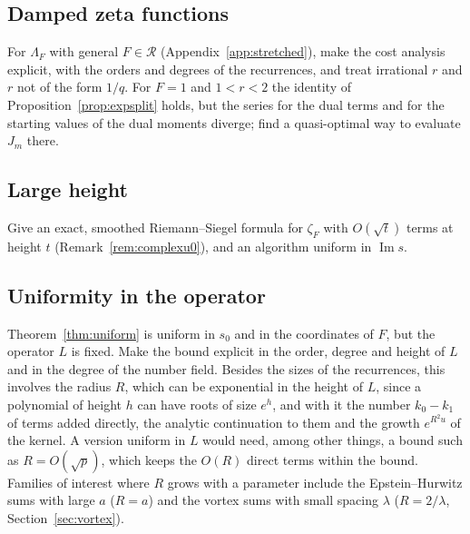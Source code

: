 \documentclass[11pt,reqno]{amsart}
\theoremstyle{definition}
\theoremstyle{remark}
\newcommand{\Reg}{\mathcal{R}}
\begin{document}
\subsection{Damped zeta functions}
For $\Lambda_F$ with general $F \in \Reg$ (Appendix~\ref{app:stretched}), make the cost analysis explicit, with the orders
and degrees of the recurrences, and treat irrational $r$ and $r$ not of the form $1/q$. For $F = 1$ and $1 < r < 2$
the identity of Proposition~\ref{prop:expsplit} holds, but the series for the dual terms and for the starting values
of the dual moments diverge; find a quasi-optimal way to evaluate $J_m$ there.

\subsection{Large height}
Give an exact, smoothed Riemann--Siegel formula for $\zeta_F$ with $O(\sqrt t)$ terms at height $t$
(Remark~\ref{rem:complexu0}), and an algorithm uniform in $\operatorname{Im}s$.

\subsection{Uniformity in the operator}\label{sec:openuniform}
Theorem~\ref{thm:uniform} is uniform in $s_0$ and in the coordinates of $F$, but the operator $L$ is fixed. Make the
bound explicit in the order, degree and height of $L$ and in the degree of the number field. Besides the sizes of the
recurrences, this involves the radius $R$, which can be exponential in the height of $L$, since a polynomial of height
$h$ can have roots of size $e^h$, and with it the number $k_0 - k_1$ of terms added directly, the analytic
continuation to them and the growth $e^{R^2u}$ of the kernel. A version uniform in $L$ would need, among other
things, a bound such as $R = O(\sqrt p)$, which keeps the $O(R)$ direct terms within the bound. Families of interest where $R$ grows with a parameter include the Epstein--Hurwitz sums with
large $a$ ($R = a$) and the vortex sums with small spacing $\lambda$ ($R = 2/\lambda$, Section~\ref{sec:vortex}).
\end{document}
